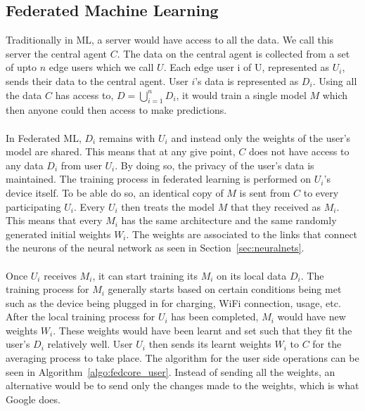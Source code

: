 \documentclass[12pt]{article}
\newcommand{\comment}[1]{}
\begin{document}
\comment{\subsection{Differential Privacy (MIGHT OMIT THIS)}
linkage attacks, netflix and imdb data to identify
only good for large dataset, else bad 
	complex
	easier to do real data and anonymise 

deidentify data (outliers, fields)
 	
want to decouple learning about an individual and learning about the population

analysis output is not dependant on a particular individual and will be the sameif they are not incuded

adjacent dataset
	n+1 and n sized dataset, algo m
}
\subsection{Federated Machine Learning}\label{subsec:fedml}
Traditionally in ML, a server would have access to all the data. We call this server the central agent $C$. The data on the central agent is collected from a set of upto $n$ edge users which we call $U$. Each edge user i of U, represented as $U_i$, sends their data to the central agent. User $i$'s data is represented as $D_i$. Using all the data $C$ has access to, $D = \bigcup_{i=1}^{n} D_i$, it would train a single model $M$ which then anyone could then access to make predictions. 
\\\\
In Federated ML, $D_i$ remains with $U_i$ and instead only the weights of the user's model are shared. This means that at any give point, $C$ does not have access to any data $D_i$ from user $U_i$. By doing so, the privacy of the user's data is maintained. The training process in federated learning is performed on $U_i$'s device itself. To be able do so, an identical copy of $M$ is sent from $C$ to every participating $U_i$. Every $U_i$ then treats the model $M$ that they received as $M_i$. This means that every $M_i$ has the same architecture and the same randomly generated initial weights $W_i$. The weights are associated to the links that connect the neurons of the neural network as seen in Section~\ref{sec:neuralnets}.
\\\\
Once $U_i$ receives $M_i$, it can start training its $M_i$ on its local data $D_i$. The training process for $M_i$ generally starts based on certain conditions being met such as the device being plugged in for charging, WiFi connection, usage, etc. After the local training process for $U_i$ has been completed, $M_i$ would have new weights $W_i$. These weights would have been learnt and set such that they fit the user's $D_i$ relatively well. User $U_i$ then sends its learnt weights $W_i$ to $C$ for the averaging process to take place. The algorithm for the user side operations can be seen in Algorithm~\ref{algo:fedcore_user}. Instead of sending all the weights, an alternative would be to send only the changes made to the weights, which is what Google does.
\end{document}
